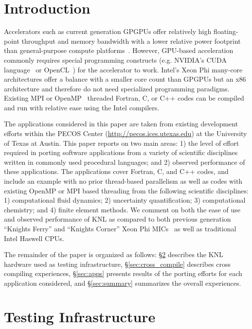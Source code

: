\section{Introduction}
\label{sec:intro}

Accelerators such as current generation GPGPUs offer relatively high
floating-point throughput and memory bandwidth with a lower relative power
footprint than general-purpose compute platforms~\cite{gpu_hpc:2009}. However,
GPU-based acceleration commonly requires special programming constructs (e.g.
NVIDIA's CUDA language~\cite{nvidia2010programming} or
OpenCL~\cite{opencl_spec}) for the accelerator to work.
Intel's Xeon Phi many-core architectures offer a balance with a smaller core
count than GPGPUs
but an x86 architecture and therefore do not need specialized programming
paradigms.  Existing MPI or OpenMP~\cite{openmp_standard} threaded Fortran, C,
or C++ codes can be compiled and run with relative ease using the Intel compilers.

The applications considered in this paper are taken from existing development
efforts within the PECOS Center (\url{http://pecos.ices.utexas.edu}) at the
University of Texas at Austin.  This paper reports on two main areas: 1) the
level of effort required in porting software applications from a variety of
scientific disciplines written in commonly used procedural languages; and 2)
observed performance of these applications.  The applications cover Fortran, C,
and C++ codes, and include an example with no prior thread-based parallelism as
well as codes with existing OpenMP or MPI based threading from the following
scientific disciplines: 1) computational fluid dynamics; 2) uncertainty
quantification; 3) computational chemistry; and 4) finite element methods.  We
comment on both the ease of use and observed performance of KNL as
compared to both previous generation ``Knights Ferry'' and ``Knights Corner'' Xeon
Phi MICs~\cite{schulz2012early} as well as traditional Intel Haswell CPUs.

The remainder of the paper is organized as follows: \S\ref{sec:hardware}
describes the KNL hardware used as testing infrastructure,
\S\ref{sec:cross_compile} describes cross compiling experiences,
\S\ref{sec:apps} presents results of the porting efforts for each application
considered, and \S\ref{sec:summary} summarizes the overall experiences.

\section{Testing Infrastructure}
\label{sec:hardware}

